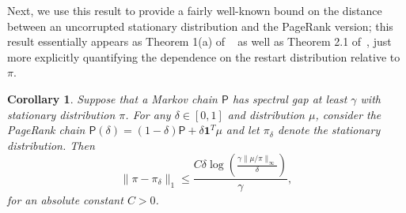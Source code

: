 \documentclass[11pt]{article}
\newtheorem{cor}[thm]{Corollary}
\theoremstyle{remark}
\begin{document}
Next, we use this result to provide a fairly well-known bound on the distance between an uncorrupted stationary distribution and the PageRank version; this result essentially appears as Theorem 1(a) of ~\cite{subramanian} as well as Theorem 2.1 of~\cite{mitrophanov2003stability}, just more explicitly quantifying the dependence on the restart distribution relative to $\pi$.
\begin{cor}
\label{cor:pr_close}
Suppose that a Markov chain $\mathsf{P}$ has spectral gap at least $\gamma$ with stationary distribution $\pi$. For any $\delta\in [0,1]$ and distribution $\mu$, consider the PageRank chain $\mathsf{P}(\delta) = (1-\delta)\mathsf{P}+\delta\bm{1}^T\mu$ and let $\pi_{\delta}$ denote the stationary distribution. Then 
\begin{equation*}
    \|\pi-\pi_{\delta}\|_1\leq \frac{C\delta\log\left(\frac{\gamma\|\mu/\pi\|_{\infty}}{\delta}\right)}{\gamma},
\end{equation*}
for an absolute constant $C>0$.
\end{cor}
\end{document}

